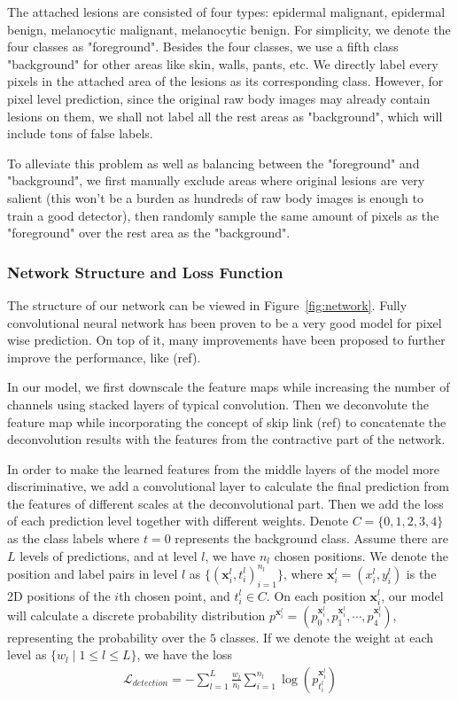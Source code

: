 \documentclass[letterpaper]{article}
\begin{document}
The attached lesions are consisted of four types: epidermal malignant, epidermal benign, melanocytic malignant, melanocytic benign. For simplicity, we denote the four classes as "foreground". Besides the four classes, we use a fifth class "background" for other areas like skin, walls, pants, etc. We directly label every pixels in the attached area of the lesions as its corresponding class. However, for pixel level prediction, since the original raw body images may already contain lesions on them, we shall not label all the rest areas as "background", which will include tons of false labels.

To alleviate this problem as well as balancing between the "foreground" and "background", we first manually exclude areas where original lesions are very salient (this won't be a burden as hundreds of raw body images is enough to train a good detector), then randomly sample the same amount of pixels as the "foreground" over the rest area as the "background".

\subsubsection{Network Structure and Loss Function}

The structure of our network can be viewed in Figure~\ref{fig:network}. Fully convolutional neural network has been proven to be a very good model for pixel wise prediction. On top of it, many improvements have been proposed to further improve the performance, like (ref). 

In our model, we first downscale the feature maps while increasing the number of channels using stacked layers of typical convolution. Then we deconvolute the feature map while incorporating the concept of skip link (ref) to concatenate the deconvolution results with the features from the contractive part of the network.

In order to make the learned features from the middle layers of the model more discriminative, we add a convolutional layer to calculate the final prediction from the features of different scales at the deconvolutional part. Then we add the loss of each prediction level together with different weights. Denote $C = \{0, 1, 2, 3, 4\}$ as the class labels where $t = 0$ represents the background class. Assume there are $L$ levels of predictions, and at level $l$, we have $n_l$ chosen positions. We denote the position and label pairs in level $l$ as $\{(\mathbf{x}_i^l, t_i^l)^{n_l}_{i=1}\}$, where $\mathbf{x}_i^l = (x_i^l, y_i^l)$ is the 2D positions of the $i$th chosen point, and $t_i^l \in C$. On each position $\mathbf{x}^l_i$, our model will calculate a discrete probability distribution $p^{\mathbf{x}^l_i} = (p_0^{\mathbf{x}^l_i}, p_1^{\mathbf{x}^l_i}, \cdots, p_4^{\mathbf{x}^l_i})$, representing the probability over the $5$ classes. If we denote the weight at each level as $\{w_l\mid 1\le l \le L\}$, we have the loss
\begin{align}
  \mathcal{L}_{detection} = -\sum_{l=1}^L \frac{w_l}{n_l} \sum_{i=1}^{n_l} \log{(p_{t_i^l}^{\mathbf{x}^l_i})}
\end{align}
\end{document}
